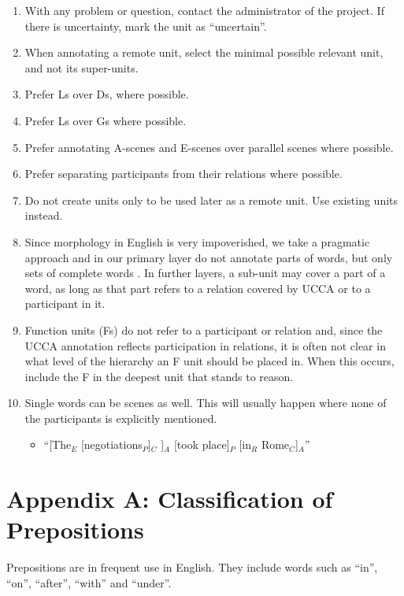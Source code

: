 \documentclass[11pt]{article}
\begin{document}
\begin{enumerate}
\item
With any problem or question, contact the administrator of the project. If there is uncertainty, mark the unit as ``uncertain''.
\item
When annotating a remote unit, select the minimal possible relevant unit, and not its super-units.
\item
Prefer Ls over Ds, where possible.
\item
Prefer Ls over Gs where possible.
\item
Prefer annotating A-scenes and E-scenes over parallel scenes where possible.
\item
Prefer separating participants from their relations where possible.
\item
Do not create units only to be used later as a remote unit. Use existing units instead.
\item
Since morphology in English is very impoverished, we take a pragmatic approach and in our primary layer do not annotate parts of words, but only sets of complete words . In further layers, a sub-unit may cover a part of a word, as long as that part refers to a relation covered by UCCA or to a participant in it.
\item
Function units (Fs) do not refer to a participant or relation and, since the UCCA annotation reflects participation in relations, it is often not clear in what level of the hierarchy an F unit should be placed in. When this occurs, include the F in the deepest unit that stands to reason.
\item
Single words can be scenes as well. This will usually happen where none of the participants is explicitly mentioned.
\begin{itemize}
\item
``[The$_E$ [negotiations$_P$]$_C$ ]$_A$ [took place]$_P$ [in$_R$ Rome$_C$]$_A$''
\end{itemize}


\end{enumerate}

\section*{\large Appendix A: Classification of Prepositions}

Prepositions are in frequent use in English. They include words such as ``in'', ``on'', ``after'', ``with'' and ``under''.
\end{document}
